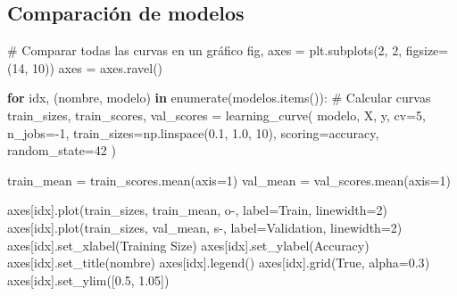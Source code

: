 \documentclass[
  doc,
  floatsintext,
  longtable,
  a4paper,
  nolmodern,
  notxfonts,
  notimes,
  12pt,
  colorlinks=true,linkcolor=blue,citecolor=blue,urlcolor=blue]{apa7}
\newenvironment{Shaded}{\begin{snugshade}}{\end{snugshade}}
\newcommand{\BuiltInTok}[1]{\textcolor[rgb]{0.00,0.23,0.31}{#1}}
\newcommand{\CommentTok}[1]{\textcolor[rgb]{0.37,0.37,0.37}{#1}}
\newcommand{\ControlFlowTok}[1]{\textcolor[rgb]{0.00,0.23,0.31}{\textbf{#1}}}
\newcommand{\DecValTok}[1]{\textcolor[rgb]{0.68,0.00,0.00}{#1}}
\newcommand{\FloatTok}[1]{\textcolor[rgb]{0.68,0.00,0.00}{#1}}
\newcommand{\KeywordTok}[1]{\textcolor[rgb]{0.00,0.23,0.31}{\textbf{#1}}}
\newcommand{\NormalTok}[1]{\textcolor[rgb]{0.00,0.23,0.31}{#1}}
\newcommand{\OperatorTok}[1]{\textcolor[rgb]{0.37,0.37,0.37}{#1}}
\newcommand{\StringTok}[1]{\textcolor[rgb]{0.13,0.47,0.30}{#1}}
\newcommand{\VariableTok}[1]{\textcolor[rgb]{0.07,0.07,0.07}{#1}}
\begin{document}
\subsection{Comparación de modelos}\label{comparaciuxf3n-de-modelos}

\begin{Shaded}
\begin{Highlighting}[]
\CommentTok{\# Comparar todas las curvas en un gráfico}
\NormalTok{fig, axes }\OperatorTok{=}\NormalTok{ plt.subplots(}\DecValTok{2}\NormalTok{, }\DecValTok{2}\NormalTok{, figsize}\OperatorTok{=}\NormalTok{(}\DecValTok{14}\NormalTok{, }\DecValTok{10}\NormalTok{))}
\NormalTok{axes }\OperatorTok{=}\NormalTok{ axes.ravel()}

\ControlFlowTok{for}\NormalTok{ idx, (nombre, modelo) }\KeywordTok{in} \BuiltInTok{enumerate}\NormalTok{(modelos.items()):}
    \CommentTok{\# Calcular curvas}
\NormalTok{    train\_sizes, train\_scores, val\_scores }\OperatorTok{=}\NormalTok{ learning\_curve(}
\NormalTok{        modelo, X, y,}
\NormalTok{        cv}\OperatorTok{=}\DecValTok{5}\NormalTok{,}
\NormalTok{        n\_jobs}\OperatorTok{={-}}\DecValTok{1}\NormalTok{,}
\NormalTok{        train\_sizes}\OperatorTok{=}\NormalTok{np.linspace(}\FloatTok{0.1}\NormalTok{, }\FloatTok{1.0}\NormalTok{, }\DecValTok{10}\NormalTok{),}
\NormalTok{        scoring}\OperatorTok{=}\StringTok{\textquotesingle{}accuracy\textquotesingle{}}\NormalTok{,}
\NormalTok{        random\_state}\OperatorTok{=}\DecValTok{42}
\NormalTok{    )}
    
\NormalTok{    train\_mean }\OperatorTok{=}\NormalTok{ train\_scores.mean(axis}\OperatorTok{=}\DecValTok{1}\NormalTok{)}
\NormalTok{    val\_mean }\OperatorTok{=}\NormalTok{ val\_scores.mean(axis}\OperatorTok{=}\DecValTok{1}\NormalTok{)}
    
\NormalTok{    axes[idx].plot(train\_sizes, train\_mean, }\StringTok{\textquotesingle{}o{-}\textquotesingle{}}\NormalTok{, label}\OperatorTok{=}\StringTok{\textquotesingle{}Train\textquotesingle{}}\NormalTok{, linewidth}\OperatorTok{=}\DecValTok{2}\NormalTok{)}
\NormalTok{    axes[idx].plot(train\_sizes, val\_mean, }\StringTok{\textquotesingle{}s{-}\textquotesingle{}}\NormalTok{, label}\OperatorTok{=}\StringTok{\textquotesingle{}Validation\textquotesingle{}}\NormalTok{, linewidth}\OperatorTok{=}\DecValTok{2}\NormalTok{)}
\NormalTok{    axes[idx].set\_xlabel(}\StringTok{\textquotesingle{}Training Size\textquotesingle{}}\NormalTok{)}
\NormalTok{    axes[idx].set\_ylabel(}\StringTok{\textquotesingle{}Accuracy\textquotesingle{}}\NormalTok{)}
\NormalTok{    axes[idx].set\_title(nombre)}
\NormalTok{    axes[idx].legend()}
\NormalTok{    axes[idx].grid(}\VariableTok{True}\NormalTok{, alpha}\OperatorTok{=}\FloatTok{0.3}\NormalTok{)}
\NormalTok{    axes[idx].set\_ylim([}\FloatTok{0.5}\NormalTok{, }\FloatTok{1.05}\NormalTok{])}


\end{Highlighting}
\end{Shaded}
\end{document}
